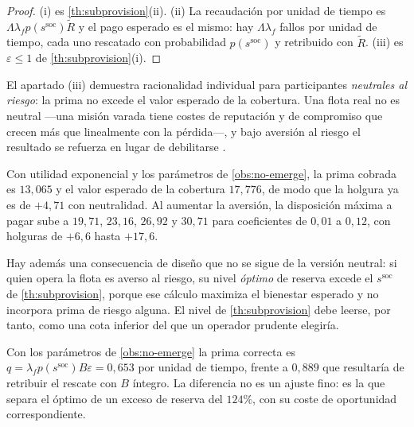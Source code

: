 \begin{proof}
(i) es \cref{th:subprovision}(ii). (ii) La recaudación por unidad de tiempo es
$\Lambda\lambda_f p(s^{\mathrm{soc}})\widetilde R$ y el pago esperado es el
mismo: hay $\Lambda\lambda_f$ fallos por unidad de tiempo, cada uno rescatado
con probabilidad $p(s^{\mathrm{soc}})$ y retribuido con $\widetilde R$. (iii) es
$\varepsilon\le1$ de \cref{th:subprovision}(i).
\end{proof}

\begin{observacion}
\label{obs:aversion-riesgo}
El apartado (iii) demuestra racionalidad individual para participantes
\emph{neutrales al riesgo}: la prima no excede el valor esperado de la cobertura.
Una flota real no es neutral —una misión varada tiene costes de reputación y de
compromiso que crecen más que linealmente con la pérdida—, y bajo aversión al
riesgo el resultado se refuerza en lugar de debilitarse
\cite{clempner2024optimization}.

Con utilidad exponencial y los parámetros de \cref{obs:no-emerge}, la prima
cobrada es $13{,}065$ y el valor esperado de la cobertura $17{,}776$, de modo que
la holgura ya es de $+4{,}71$ con neutralidad. Al aumentar la aversión, la
disposición máxima a pagar sube a $19{,}71$, $23{,}16$, $26{,}92$ y $30{,}71$
para coeficientes de $0{,}01$ a $0{,}12$, con holguras de $+6{,}6$ hasta
$+17{,}6$.

Hay además una consecuencia de diseño que no se sigue de la versión neutral: si
quien opera la flota es averso al riesgo, su nivel \emph{óptimo} de reserva
excede el $s^{\mathrm{soc}}$ de \cref{th:subprovision}, porque ese cálculo
maximiza el bienestar esperado y no incorpora prima de riesgo alguna. El nivel de
\cref{th:subprovision} debe leerse, por tanto, como una cota inferior del que un
operador prudente elegiría.
\end{observacion}

\begin{observacion}
\label{obs:prima-num}
Con los parámetros de \cref{obs:no-emerge} la prima correcta es
$q=\lambda_f p(s^{\mathrm{soc}})B\varepsilon=0{,}653$ por unidad de tiempo, frente
a $0{,}889$ que resultaría de retribuir el rescate con $B$ íntegro. La diferencia
no es un ajuste fino: es la que separa el óptimo de un exceso de reserva del
$124\%$, con su coste de oportunidad correspondiente.
\end{observacion}

